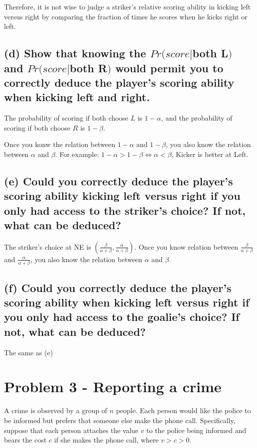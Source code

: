 \documentclass{article}
\begin{document}
\medskip

Therefore, it is not wise to judge a striker's relative scoring ability in kicking left versus right by comparing the fraction of times he scores when he kicks right or left.


\subsection*{(d) Show that knowing the $Pr(score|$both L$)$ and $Pr(score|$both R$)$ would permit you to correctly deduce the player's scoring ability when kicking left and right.}

The probability of scoring if both choose $L$ is $1 - \alpha$, and the probability of scoring if both choose $R$ is $1 - \beta$. 


Once you konw the relation between $1 - \alpha$ and $1 - \beta$, you also know the relation between $\alpha$ and $\beta $. For example: $1 - \alpha > 1 - \beta \iff \alpha <  \beta $, Kicker is better at Left.


\subsection*{(e) Could you correctly deduce the player's scoring ability kicking left versus right if you only had access to the striker's choice? If not, what can be deduced?}

The striker's choice at NE is $(\tfrac{\beta}{\alpha + \beta},\tfrac{\alpha}{\alpha + \beta})$.
Once you know relation between $\tfrac{\beta}{\alpha + \beta}$ and $\tfrac{\alpha}{\alpha + \beta}$, you also know the relation between $\alpha$ and $\beta $.


\subsection*{(f) Could you correctly deduce the player's scoring ability when kicking left versus right if you only had access to the goalie's choice? If not, what can be deduced?}

The same as (e)


\newpage

\section{Problem 3 - Reporting a crime}

A crime is observed by a group of $n$ people. Each person would like the police to be informed
but prefers that someone else make the phone call. Specifically, suppose that each person
attaches the value $v$ to the police being informed and bears the cost $c$ if she makes the
phone call, where $v > c > 0$.
\end{document}
